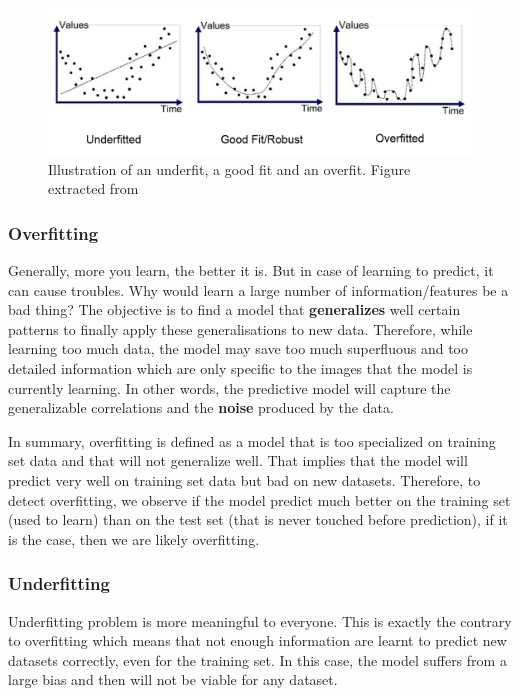 \documentclass[11pt, openany]{report}
\theoremstyle{plain}
\theoremstyle{definition}
\theoremstyle{remark}
\begin{document}
\begin{figure}[h]
  \centering
  \includegraphics[scale=0.35]{figures/over-under-fit.png}
  \caption{Illustration of an underfit, a good fit and an overfit. Figure extracted from \cite{over-under-fit-schema} }
  \label{fig:over-under-fit}
\end{figure}

\subsubsection{Overfitting}
Generally, more you learn, the better it is. But in case of learning to predict, it can cause troubles. Why would learn a large number of information/features be a bad thing? 
The objective is to find a model that \textbf{generalizes} well certain patterns to finally apply these generalisations to new data. Therefore, while learning too much data, the model may save too much superfluous and too detailed information which are only specific to the images that the model is currently learning. In other words, the predictive model will capture the generalizable correlations and the \textbf{noise} produced by the data.

In summary, overfitting is defined as a model that is too specialized on training set data and that will not generalize well. That implies that the model will predict very well on training set data but bad on new datasets. Therefore, to detect overfitting, we observe if the model predict much better on the training set (used to learn) than on the test set (that is never touched before prediction), if it is the case, then we are likely overfitting.


\subsubsection{Underfitting}
Underfitting problem is more meaningful to everyone. This is exactly the contrary to overfitting which means that not enough information are learnt to predict new datasets correctly, even for the training set. In this case, the model suffers from a large bias and then will not be viable for any dataset. 
\end{document}
